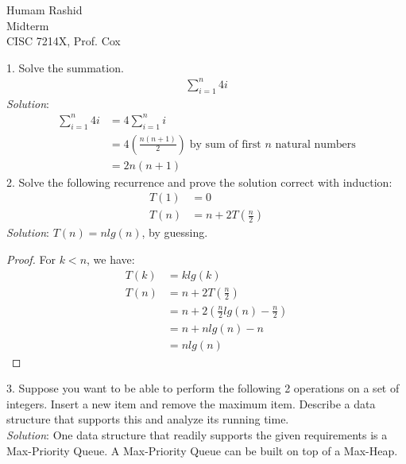 \documentclass{scrartcl}
\begin{document}
\begin{flushleft}

    Humam Rashid\\
    Midterm\\
    CISC 7214X, Prof. Cox\\
    \bigskip
    
    1. Solve the summation.
    \begin{align*}
        \sum_{i=1}^{n} 4i
    \end{align*}
    \textit{Solution}:
    \begin{align*}
        \sum_{i=1}^{n} 4i &= 4 \sum_{i=1}^{n} i\\
                          &= 4 (\frac{n (n + 1)}{2})\;\text{by sum of first $n$ natural numbers}\\
                          &= 2n(n + 1)
    \end{align*}
    2. Solve the following recurrence and prove the solution correct with induction:
    \begin{align*}
        T(1) &= 0\\
        T(n) &= n + 2 T(\frac{n}{2})
    \end{align*}
    \textit{Solution}: $T(n) = n lg(n)$, by guessing.
    \medskip
    \begin{proof}
        For $k < n$, we have:\\
        \begin{align*}
            T(k) &= k lg(k)\\
            T(n) &= n + 2 T(\frac{n}{2})\\
                 &= n + 2 (\frac{n}{2} lg(n) - \frac{n}{2})\\
                 &= n + n lg(n) - n\\
                 &= n lg(n)
        \end{align*}
    \end{proof}
    3. Suppose you want to be able to perform the following 2 operations on a set of integers.
    Insert a new item and remove the maximum item. Describe a data structure that supports this and
    analyze its running time.\\
    \bigskip
    \textit{Solution}: One data structure that readily supports the given requirements is a
    Max-Priority Queue. A Max-Priority Queue can be built on top of a Max-Heap.

\end{flushleft}
\end{document}
